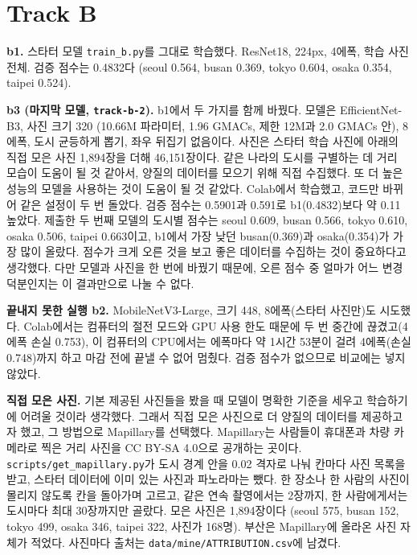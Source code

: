 \documentclass[11pt]{article}
\begin{document}
\section*{Track B}

\textbf{b1.} 스타터 모델 \texttt{train\_b.py}를 그대로 학습했다. ResNet18, 224px, 4에폭,
학습 사진 전체. 검증 점수는 0.4832다 (seoul 0.564, busan 0.369, tokyo 0.604, osaka 0.354,
taipei 0.524).

\textbf{b3 (마지막 모델, \texttt{track-b-2}).} b1에서 두 가지를 함께 바꿨다. 모델은
EfficientNet-B3, 사진 크기 320 (10.66M 파라미터, 1.96 GMACs, 제한 12M과 2.0 GMACs 안),
8에폭, 도시 균등하게 뽑기, 좌우 뒤집기 없음이다. 사진은 스타터 학습 사진에 아래의 직접 모은
사진 1,894장을 더해 46,151장이다. 같은 나라의 도시를 구별하는 데 거리 모습이 도움이 될 것
같아서, 양질의 데이터를 모으기 위해 직접 수집했다. 또 더 높은 성능의 모델을 사용하는 것이
도움이 될 것 같았다. Colab에서 학습했고, 코드만 바뀌어 같은 설정이 두 번 돌았다. 검증 점수는
0.5901과 0.591로 b1(0.4832)보다 약 0.11 높았다. 제출한 두 번째 모델의 도시별 점수는 seoul
0.609, busan 0.566, tokyo 0.610, osaka 0.506, taipei 0.663이고, b1에서 가장 낮던 busan(0.369)과
osaka(0.354)가 가장 많이 올랐다. 점수가 크게 오른 것을 보고 좋은 데이터를 수집하는 것이
중요하다고 생각했다. 다만 모델과 사진을 한 번에 바꿨기 때문에, 오른 점수 중 얼마가 어느
변경 덕분인지는 이 결과만으로 나눌 수 없다.

\textbf{끝내지 못한 실행 b2.} MobileNetV3-Large, 크기 448, 8에폭(스타터 사진만)도 시도했다.
Colab에서는 컴퓨터의 절전 모드와 GPU 사용 한도 때문에 두 번 중간에 끊겼고(4에폭 손실 0.753),
이 컴퓨터의 CPU에서는 에폭마다 약 1시간 53분이 걸려 4에폭(손실 0.748)까지 하고 마감 전에
끝낼 수 없어 멈췄다. 검증 점수가 없으므로 비교에는 넣지 않았다.

\textbf{직접 모은 사진.} 기본 제공된 사진들을 봤을 때 모델이 명확한 기준을 세우고 학습하기에 어려울 것이라 생각했다. 그래서 직접 모은 사진으로 더 양질의 데이터를 제공하고자 했고, 그 방법으로 Mapillary를 선택했다. Mapillary는 사람들이 휴대폰과 차량 카메라로 찍은 거리 사진을 CC BY-SA 4.0으로 공개하는 곳이다. \texttt{scripts/get\_mapillary.py}가 도시 경계 안을 0.02\textdegree{} 격자로 나눠 칸마다 사진 목록을 받고, 스타터 데이터에 이미 있는 사진과 파노라마는 뺐다. 한 장소나 한 사람의 사진이 몰리지 않도록 칸을 돌아가며 고르고, 같은 연속 촬영에서는 2장까지, 한 사람에게서는 도시마다 최대 30장까지만 골랐다. 모은 사진은 1,894장이다 (seoul 575, busan 152, tokyo 499, osaka 346, taipei 322, 사진가 168명). 부산은 Mapillary에 올라온 사진 자체가 적었다. 사진마다 출처는 \texttt{data/mine/ATTRIBUTION.csv}에 남겼다.
\end{document}
